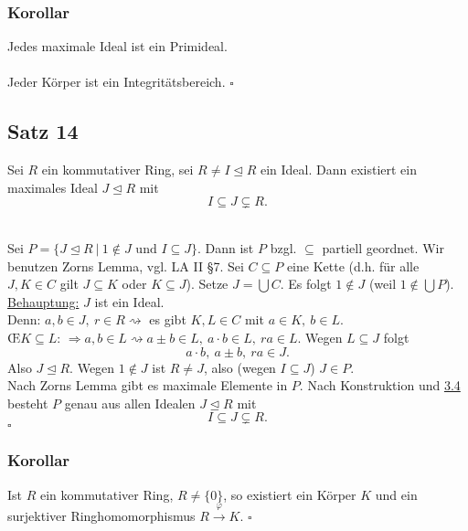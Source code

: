 \subsubsection*{Korollar}
Jedes maximale Ideal ist ein Primideal.\\

\\
Jeder Körper ist ein Integritätsbereich.
\hfill $\square$

\subsection{Satz 14}
\label{sub:satz_14}
Sei $R$ ein kommutativer Ring, sei $R\neq I\trianglelefteq R$ ein Ideal.
Dann existiert ein maximales Ideal $J\trianglelefteq R$ mit 
\[
I\subseteq J\subsetneq R.
\]

\\
Sei $P=\{J\trianglelefteq R~|~1\notin J\text{ und }I\subseteq J \}$.
Dann ist $P$ bzgl. $\subseteq$ partiell geordnet.
Wir benutzen Zorns Lemma, vgl. LA II §7.
Sei $C\subseteq P$ eine Kette (d.h. für alle $J,K\in C$ gilt $J\subseteq K$ oder $K\subseteq J$).
Setze $J=\bigcup C$.
Es folgt $1\notin J$ (weil $1\notin \bigcup P$).\\
\uline{Behauptung:} $J$ ist ein Ideal.\\
Denn: $a,b\in J,~r\in R\rightsquigarrow$ es gibt $K,L\in C$ mit $a\in K,~b\in L$.\\
\OE $K\subseteq L$: $\Rightarrow a,b\in L\rightsquigarrow a\pm b\in L,~a\cdot b\in L,~ra\in L$.
Wegen $L\subseteq J$ folgt
\[
a\cdot b,~a\pm b,~ ra\in J.
\]
Also $J\trianglelefteq R$.
Wegen $1\notin J$ ist $R\neq J$, also (wegen $I\subseteq J$) $J\in P$.\\
Nach Zorns Lemma gibt es maximale Elemente in $P$.
Nach Konstruktion und \hyperref[sub:homomor_ideale]{3.4} besteht $P$ genau aus allen Idealen $J\trianglelefteq R$ mit
\[
I\subseteq J\subsetneq R.
\]
\hfill $\square$

\subsubsection*{Korollar}
Ist $R$ ein kommutativer Ring, $R\neq \{0\}$, so existiert ein Körper $K$ und ein surjektiver Ringhomomorphismus $R\stackrel{\varphi}{\to}K$.
\hfill $\square$

